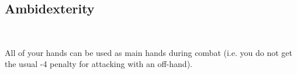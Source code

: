 \subsection*{Ambidexterity}\label{feat:ambidexterity}
 \\

All of your hands can be used as main hands during combat (i.e. you do not
get the usual -4 penalty for attacking with an off-hand).
